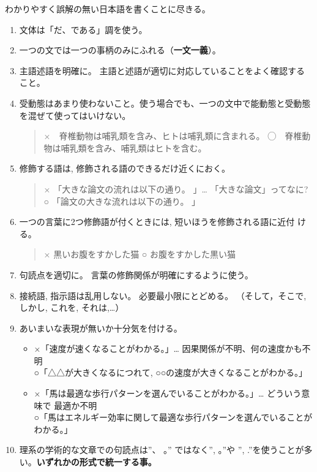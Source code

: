 \documentclass[12pt, ]{jsarticle}
\begin{document}
わかりやすく誤解の無い日本語を書くことに尽きる。

\begin{enumerate}
\item
  文体は「だ、である」調を使う。
\item
  一つの文では一つの事柄のみにふれる（\textbf{一文一義}）。
\item
  主語述語を明確に。
  主語と述語が適切に対応していることをよく確認すること。
\item
  受動態はあまり使わないこと。使う場合でも、一つの文中で能動態と受動態を混ぜて使ってはいけない。

  \begin{quote}
  ×　脊椎動物は哺乳類を含み、ヒトは哺乳類に含まれる。
  ◯　脊椎動物は哺乳類を含み、哺乳類はヒトを含む。
  \end{quote}
\item
  修飾する語は, 修飾される語のできるだけ近くにおく。

  \begin{quote}
  × 「大きな論文の流れは以下の通り。 」\ldots{}
  「大きな論文」ってなに?\\
  ○ 「論文の大きな流れは以下の通り。 」
  \end{quote}
\item
  一つの言葉に2つ修飾語が付くときには, 短いほうを修飾される語に近付
  ける。

  \begin{quote}
  × 黒いお腹をすかした猫 ○ お腹をすかした黒い猫
  \end{quote}
\item
  句読点を適切に。 言葉の修飾関係が明確にするように使う。
\item
  接続語, 指示語は乱用しない。 必要最小限にとどめる。 （そして，そこで,
  しかし, これを, それは,\ldots）
\item
  あいまいな表現が無いか十分気を付ける。

  \begin{itemize}
  \item
    ×「速度が速くなることがわかる。」\ldots{}
    因果関係が不明、何の速度かも不明\\
    ○「△△が大きくなるにつれて, ○○の速度が大きくなることがわかる。」
  \item
    ×「馬は最適な歩行パターンを選んでいることがわかる。」\ldots{}
    どういう意味で 最適か不明\\
    ○「馬はエネルギー効率に関して最適な歩行パターンを選んでいることがわかる。」
  \end{itemize}
\item
  理系の学術的な文章での句読点は''、 。'' ではなく'', 。''や '',
  .''を使うことが多い。\textbf{いずれかの形式で統一する事。}
\end{enumerate}
\end{document}
